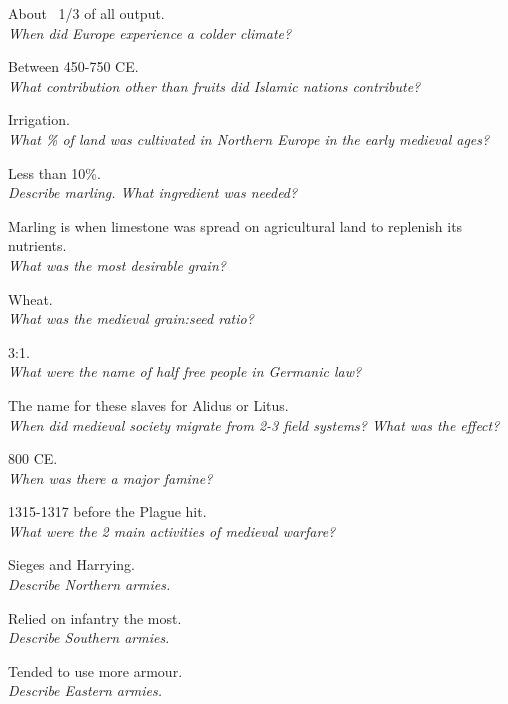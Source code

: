 \documentclass[12pt]{article}
\begin{document}
About ~1/3 of all output.\\

\textit{When did Europe experience a colder climate?}

Between 450-750 CE.\\

\textit{What contribution other than fruits did Islamic nations contribute?}

Irrigation.\\

\textit{What \% of land was cultivated in Northern Europe in the early medieval ages?}

Less than 10\%.\\

\textit{Describe marling. What ingredient was needed?}

Marling is when limestone was spread on agricultural land to replenish its nutrients.\\

\textit{What was the most desirable grain?}

Wheat.\\

\textit{What was the medieval grain:seed ratio?}

3:1.\\

\textit{What were the name of half free people in Germanic law?}

The name for these slaves for Alidus or Litus.\\

\textit{When did medieval society migrate from 2-3 field systems? What was the effect?}

800 CE.\\

\textit{When was there a major famine?}

1315-1317 before the Plague hit.\\

\textit{What were the 2 main activities of medieval warfare?}

Sieges and Harrying.\\

\textit{Describe Northern armies.}

Relied on infantry the most.\\

\textit{Describe Southern armies.}

Tended to use more armour.\\

\textit{Describe Eastern armies.}
\end{document}
